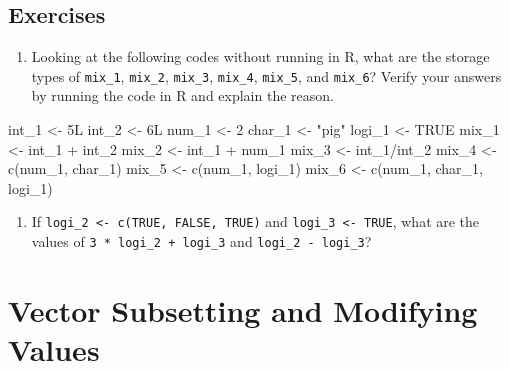 \documentclass[
]{book}
\newenvironment{Shaded}{\begin{snugshade}}{\end{snugshade}}
\newcommand{\ConstantTok}[1]{\textcolor[rgb]{0.00,0.00,0.00}{#1}}
\newcommand{\DecValTok}[1]{\textcolor[rgb]{0.00,0.00,0.81}{#1}}
\newcommand{\FunctionTok}[1]{\textcolor[rgb]{0.00,0.00,0.00}{#1}}
\newcommand{\NormalTok}[1]{#1}
\newcommand{\OtherTok}[1]{\textcolor[rgb]{0.56,0.35,0.01}{#1}}
\newcommand{\SpecialCharTok}[1]{\textcolor[rgb]{0.00,0.00,0.00}{#1}}
\newcommand{\StringTok}[1]{\textcolor[rgb]{0.31,0.60,0.02}{#1}}
\providecommand{\tightlist}{%
  \setlength{\itemsep}{0pt}\setlength{\parskip}{0pt}}
\begin{document}
\hypertarget{exercises-6}{%
\subsection{Exercises}\label{exercises-6}}

\begin{enumerate}
\def\labelenumi{\arabic{enumi}.}
\tightlist
\item
  Looking at the following codes without running in R, what are the storage types of \texttt{mix\_1}, \texttt{mix\_2}, \texttt{mix\_3}, \texttt{mix\_4}, \texttt{mix\_5}, and \texttt{mix\_6}? Verify your answers by running the code in R and explain the reason.
\end{enumerate}

\begin{Shaded}
\begin{Highlighting}[]
\NormalTok{int\_1 }\OtherTok{\textless{}{-}}\NormalTok{ 5L}
\NormalTok{int\_2 }\OtherTok{\textless{}{-}}\NormalTok{ 6L}
\NormalTok{num\_1 }\OtherTok{\textless{}{-}} \DecValTok{2}
\NormalTok{char\_1 }\OtherTok{\textless{}{-}} \StringTok{"pig"}
\NormalTok{logi\_1 }\OtherTok{\textless{}{-}} \ConstantTok{TRUE}
\NormalTok{mix\_1 }\OtherTok{\textless{}{-}}\NormalTok{ int\_1 }\SpecialCharTok{+}\NormalTok{ int\_2 }
\NormalTok{mix\_2 }\OtherTok{\textless{}{-}}\NormalTok{ int\_1 }\SpecialCharTok{+}\NormalTok{ num\_1}
\NormalTok{mix\_3 }\OtherTok{\textless{}{-}}\NormalTok{ int\_1}\SpecialCharTok{/}\NormalTok{int\_2}
\NormalTok{mix\_4 }\OtherTok{\textless{}{-}} \FunctionTok{c}\NormalTok{(num\_1, char\_1)}
\NormalTok{mix\_5 }\OtherTok{\textless{}{-}} \FunctionTok{c}\NormalTok{(num\_1, logi\_1)}
\NormalTok{mix\_6 }\OtherTok{\textless{}{-}} \FunctionTok{c}\NormalTok{(num\_1, char\_1, logi\_1)}
\end{Highlighting}
\end{Shaded}

\begin{enumerate}
\def\labelenumi{\arabic{enumi}.}
\setcounter{enumi}{1}
\tightlist
\item
  If \texttt{logi\_2\ \textless{}-\ c(TRUE,\ FALSE,\ TRUE)} and \texttt{logi\_3\ \textless{}-\ TRUE},
  what are the values of \texttt{3\ *\ logi\_2\ +\ logi\_3} and \texttt{logi\_2\ -\ logi\_3}?
\end{enumerate}

\hypertarget{subsetting-and-modify-values}{%
\section{Vector Subsetting and Modifying Values}\label{subsetting-and-modify-values}}
\end{document}
